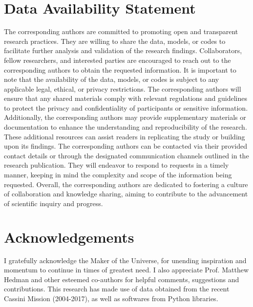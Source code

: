 \documentclass{article}
\begin{document}
\section{Data Availability Statement}
The corresponding authors are committed to promoting open and transparent research practices. They are willing to share the data, models, or codes to facilitate further analysis and validation of the research findings. Collaborators, fellow researchers, and interested parties are encouraged to reach out to the corresponding authors to obtain the requested information. It is important to note that the availability of the data, models, or codes is subject to any applicable legal, ethical, or privacy restrictions. The corresponding authors will ensure that any shared materials comply with relevant regulations and guidelines to protect the privacy and confidentiality of participants or sensitive information. Additionally, the corresponding authors may provide supplementary materials or documentation to enhance the understanding and reproducibility of the research. These additional resources can assist readers in replicating the study or building upon its findings. The corresponding authors can be contacted via their provided contact details or through the designated communication channels outlined in the research publication. They will endeavor to respond to requests in a timely manner, keeping in mind the complexity and scope of the information being requested. Overall, the corresponding authors are dedicated to fostering a culture of collaboration and knowledge sharing, aiming to contribute to the advancement of scientific inquiry and progress.

\section{Acknowledgements}
I gratefully acknowledge the Maker of the Universe, for unending inspiration and momentum to continue in times of greatest need. I also appreciate Prof. Matthew Hedman and other esteemed co-authors for helpful comments, suggestions and contributions. This research has made use of data obtained from the recent Cassini Mission (2004-2017), as well as softwares from Python libraries. 









\end{document}
